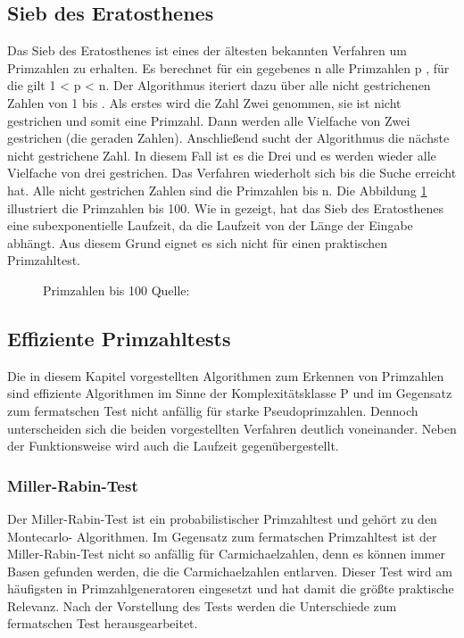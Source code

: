	\subsection{Sieb des Eratosthenes}
	Das Sieb des Eratosthenes ist eines der ältesten bekannten Verfahren um Primzahlen zu erhalten. Es berechnet für ein gegebenes n \myin {} alle Primzahlen p \myin {}, für die gilt 1 < p < n. Der Algorithmus iteriert dazu über alle nicht gestrichenen Zahlen von 1 bis . Als erstes wird die Zahl Zwei genommen, sie ist nicht gestrichen und somit eine Primzahl. Dann werden alle Vielfache von Zwei gestrichen (die geraden Zahlen). Anschließend sucht der Algorithmus die nächste nicht gestrichene Zahl. In diesem Fall ist es die Drei und es werden wieder alle Vielfache von drei gestrichen. Das Verfahren wiederholt sich bis die Suche  erreicht hat. Alle nicht gestrichen Zahlen sind die Primzahlen bis n. Die Abbildung \ref{ABBILDUNG_Primzahlen_100} illustriert die Primzahlen bis 100.
	Wie in \cite{Algebraische:und:zahlentheoretische:Grundlagen:fuer:die:Informatik} gezeigt, hat das Sieb des Eratosthenes eine subexponentielle Laufzeit, da die Laufzeit von der Länge der Eingabe abhängt. Aus diesem Grund eignet es sich nicht für einen praktischen Primzahltest.
	\begin{figure}
		\centering
		\caption{Primzahlen bis 100 Quelle: \cite{Mathe:Lexikon:SiebDesEratosthenes}}
		\label{ABBILDUNG_Primzahlen_100}
	\end{figure}
	
	\subsection{Effiziente Primzahltests} \label{Effiziente Primzahltests}
		Die in diesem Kapitel vorgestellten Algorithmen zum Erkennen von Primzahlen sind effiziente Algorithmen im Sinne der Komplexitätsklasse P und im Gegensatz zum fermatschen Test nicht anfällig für starke Pseudoprimzahlen. Dennoch unterscheiden sich die beiden vorgestellten Verfahren deutlich voneinander. Neben der Funktionsweise wird auch die Laufzeit gegenübergestellt.
		
		\subsubsection{Miller-Rabin-Test}
		 Der Miller-Rabin-Test ist ein probabilistischer Primzahltest und gehört zu den Montecarlo- Algorithmen. Im Gegensatz zum fermatschen Primzahltest ist der Miller-Rabin-Test nicht so anfällig für Carmichaelzahlen, denn es können immer Basen gefunden werden, die die Carmichaelzahlen entlarven. Dieser Test wird am häufigsten in Primzahlgeneratoren eingesetzt und hat damit die größte praktische Relevanz. Nach der Vorstellung des Tests werden die Unterschiede zum fermatschen Test herausgearbeitet.
		 
